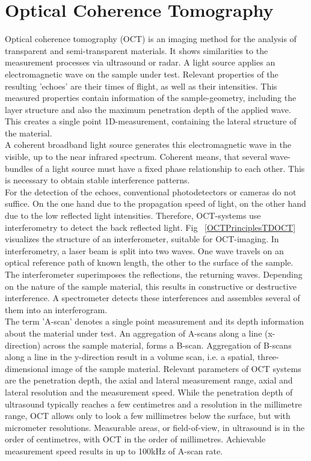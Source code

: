 \section{Optical Coherence Tomography}
Optical coherence tomography (OCT) is an imaging method for the analysis of transparent and semi-transparent materials. It shows similarities to the measurement processes via ultrasound or radar. A light source applies an electromagnetic wave on the sample under test. Relevant properties of the resulting 'echoes' are their times of flight, as well as their intensities. This measured properties contain information of the sample-geometry, including the layer structure and also the maximum penetration depth of the applied wave. This creates a single point 1D-measurement, containing the lateral structure of the material. \\ 
A coherent broadband light source generates this electromagnetic wave in the visible, up to the near infrared spectrum. Coherent means, that several wave-bundles of a light source must have a fixed phase relationship to each other. This is necessary to obtain stable interference patterns. \\ 
For the detection of the echoes, conventional photodetectors or cameras do not suffice. On the one hand due to the propagation speed of light, on the other hand due to the low reflected light intensities. Therefore, OCT-systems use interferometry to detect the back reflected light. Fig ~\ref{OCTPrinciplesTDOCT} visualizes the structure of an interferometer, suitable for OCT-imaging. In interferometry, a laser beam is split into two waves. One wave travels on an optical reference path of known length, the other to the surface of the sample. The interferometer superimposes the reflections, the returning waves. Depending on the nature of the sample material, this results in constructive or destructive interference. A spectrometer detects these interferences and assembles several of them into an interferogram. \\ 
The term 'A-scan' denotes a single point measurement and its depth information about the material under test. An aggregation of A-scans along a line (x-direction) across the sample material, forms a B-scan. Aggregation of B-scans along a line in the y-direction result in a volume scan, i.e. a spatial, three-dimensional image of the sample material. Relevant parameters of OCT systems are the penetration depth, the axial and lateral measurement range, axial and lateral resolution and the measurement speed. While the penetration depth of ultrasound typically reaches a few centimetres and a resolution in the millimetre range, OCT allows only to look a few millimetres below the surface, but with micrometer resolutions. Measurable areas, or field-of-view, in ultrasound is in the order of centimetres, with OCT in the order of millimetres. Achievable measurement speed results in up to 100kHz of A-scan rate. \\ 
